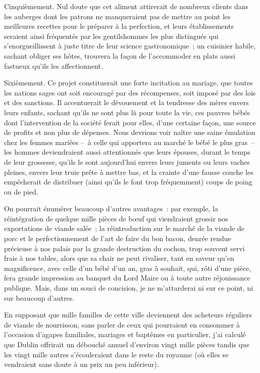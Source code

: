 \documentclass[french,twoside]{book} %
\begin{document}
Cinquièmement. Nul doute que cet aliment attirerait de nombreux clients dans les auberges dont les patrons ne manqueraient pas de mettre au point les meilleures recettes pour le préparer à la perfection, et leurs établissements seraient ainsi fréquentés par les gentilshommes les plus distingués qui s’enorgueillissent à juste titre de leur science gastronomique ; un cuisinier habile, sachant obliger ses hôtes, trouvera la façon de l’accommoder en plats aussi fastueux qu’ils les affectionnent.\par
Sixièmement. Ce projet constituerait une forte incitation au mariage, que toutes les nations sages ont soit encouragé par des récompenses, soit imposé par des lois et des sanctions. Il accentuerait le dévouement et la tendresse des mères envers leurs enfants, sachant qu’ils ne sont plus là pour toute la vie, ces pauvres bébés dont l’intervention de la société ferait pour elles, d’une certaine façon, une source de profits et non plus de dépenses. Nous devrions voir naître une saine émulation chez les femmes mariées – à celle qui apportera au marché le bébé le plus gras – les hommes deviendraient aussi attentionnés que leurs épouses, durant le temps de leur grossesse, qu’ils le sont aujourd’hui envers leurs juments ou leurs vaches pleines, envers leur truie prête à mettre bas, et la crainte d’une fausse couche les empêcherait de distribuer (ainsi qu’ils le font trop fréquemment) coups de poing ou de pied.\par
On pourrait énumérer beaucoup d’autres avantages : par exemple, la réintégration de quelque mille pièces de bœuf qui viendraient grossir nos exportations de viande salée ; la réintroduction sur le marché de la viande de porc et le perfectionnement de l’art de faire du bon bacon, denrée rendue précieuse à nos palais par la grande destruction du cochon, trop souvent servi frais à nos tables, alors que sa chair ne peut rivaliser, tant en saveur qu’en magnificence, avec celle d’un bébé d’un an, gras à souhait, qui, rôti d’une pièce, fera grande impression au banquet du Lord Maire ou à toute autre réjouissance publique. Mais, dans un souci de concision, je ne m’attarderai ni sur ce point, ni sur beaucoup d’autres.\par
En supposant que mille familles de cette ville deviennent des acheteurs réguliers de viande de nourrisson, sans parler de ceux qui pourraient en consommer à l’occasion d’agapes familiales, mariages et baptêmes en particulier, j’ai calculé que Dublin offrirait un débouché annuel d’environ vingt mille pièces tandis que les vingt mille autres s’écouleraient dans le reste du royaume (où elles se vendraient sans doute à un prix un peu inférieur).\par
\end{document}
